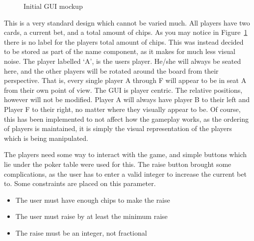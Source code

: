 \begin{figure}[h]
    \caption{Initial GUI mockup}%
    \label{fig:initialgui}
\end{figure}

This is a very standard design which cannot be varied much. All players have
two cards, a current bet, and a total amount of chips. As you may notice
in Figure~\ref{fig:initialgui} there is no label for the players total amount
of chips. This was instead decided to be stored as part of the name component,
as it makes for much less visual noise. The player labelled `A', is the
users player. He/she will always be seated here, and the other players will
be rotated around the board from their perspective. That is, every single
player A through F will appear to be in seat A from their own point of view.
The GUI is player centric. The relative positions, however will not be 
modified. Player A will always have player B to their left and Player F to 
their right, no matter where they visually appear to be. Of course, this has 
been implemented to not affect how the gameplay works, as the ordering of 
players is maintained, it is simply the visual representation of the players 
which is being manipulated.

The players need some way to interact with the game, and simple buttons which 
lie under the poker table were used for this. The raise button brought some 
complications, as the user has to enter a valid integer to increase the current
bet to. Some constraints are placed on this parameter.

\begin{itemize}
\item The user must have enough chips to make the raise
\item The user must raise by at least the minimum raise
\item The raise must be an integer, not fractional
\end{itemize}

